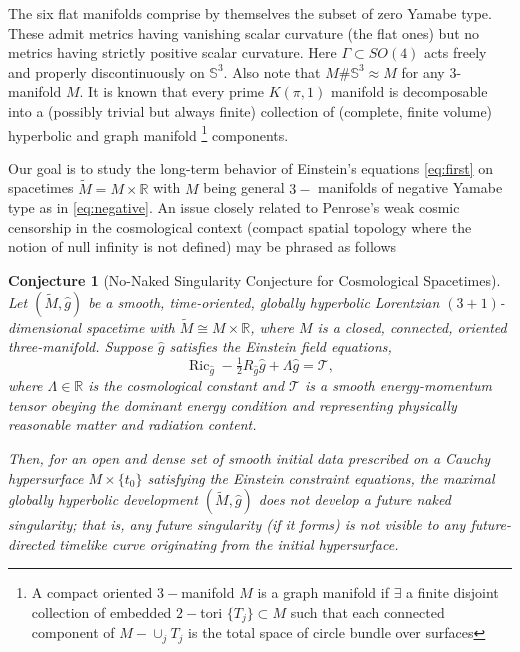 \documentclass{amsart}
\newtheorem{conjecture}{Conjecture}[section]
\begin{document}
The six flat manifolds
comprise by themselves the subset of zero Yamabe type. These admit metrics
having vanishing scalar curvature (the flat ones) but no metrics having strictly
positive scalar curvature. Here $\Gamma\subset SO(4)$ acts freely and properly discontinuously on $\mathbb{S}^{3}$. Also note that $M\#\mathbb{S}^{3}\approx M$ for any 3-manifold $M$. It is known that every prime $K(\pi,1)$ manifold is decomposable
into a (possibly trivial but always finite) collection of (complete, finite volume)
hyperbolic and graph manifold \footnote{A compact oriented $3-$manifold $M$ is a graph manifold if $\exists$ a finite disjoint collection of embedded $2-$tori $\{T_{j}\}\subset M$ such that each connected component of $M-\cup_{j}T_{j}$ is the total space of circle bundle over surfaces} components. 

\noindent Our goal is to study the long-term behavior of Einstein's equations \ref{eq:first} on spacetimes $\widetilde{M}=M\times \mathbb{R}$ with $M$ being general $3-$ manifolds of negative Yamabe type as in \ref{eq:negative}. An issue closely related to Penrose's weak cosmic censorship \cite{penrose1999question} in the cosmological context (compact spatial topology where the notion of null infinity is not defined) may be phrased as follows    

\begin{conjecture}[No-Naked Singularity Conjecture for Cosmological Spacetimes]
\label{conjecture1}
Let $(\widetilde{M}, \widehat{g})$ be a smooth, time-oriented, globally hyperbolic Lorentzian $(3+1)$-dimensional spacetime with $\widetilde{M} \cong M \times \mathbb{R}$, where $M$ is a closed, connected, oriented three-manifold. Suppose $\widehat{g}$ satisfies the Einstein field equations,
\[
\operatorname{Ric}_{\widehat{g}} - \tfrac{1}{2} R_{\widehat{g}} \widehat{g} + \Lambda \widehat{g} =\mathcal{T},
\]
where $\Lambda \in \mathbb{R}$ is the cosmological constant and $\mathcal{T}$ is a smooth energy-momentum tensor obeying the dominant energy condition and representing physically reasonable matter and radiation content.

\noindent Then, for an open and dense set of smooth initial data prescribed on a Cauchy hypersurface $M \times \{t_0\}$ satisfying the Einstein constraint equations, the maximal globally hyperbolic development $(\widetilde{M}, \widehat{g})$ does not develop a future naked singularity; that is, any future singularity (if it forms) is not visible to any future-directed timelike curve originating from the initial hypersurface.
\end{conjecture}
\end{document}

